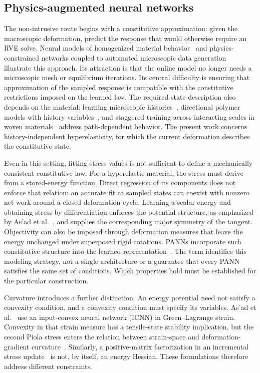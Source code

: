 \subsection{Physics-augmented neural networks}
The non-intrusive route begins with a constitutive approximation: given the macroscopic deformation, predict the response that would otherwise require an RVE solve. Neural models of homogenized material behavior~\cite{Aldakheel2023} and physics-constrained networks coupled to automated microscopic data generation~\cite{kalina2023} illustrate this approach. Its attraction is that the online model no longer needs a microscopic mesh or equilibrium iterations. Its central difficulty is ensuring that approximation of the sampled response is compatible with the constitutive restrictions imposed on the learned law. The required state description also depends on the material: learning microscopic histories~\cite{Liu2022}, directional polymer models with history variables~\cite{Ghaderi2020}, and staggered training across interacting scales in woven materials~\cite{AsadFarhat2026} address path-dependent behavior. The present work concerns history-independent hyperelasticity, for which the current deformation describes the constitutive state.

Even in this setting, fitting stress values is not sufficient to define a mechanically consistent constitutive law. For a hyperelastic material, the stress must derive from a stored-energy function. Direct regression of its components does not enforce that relation: an accurate fit at sampled states can coexist with nonzero net work around a closed deformation cycle. Learning a scalar energy and obtaining stress by differentiation enforces the potential structure, as emphasized by As'ad et al.~\cite{asad2022}, and supplies the corresponding major symmetry of the tangent. Objectivity can also be imposed through deformation measures that leave the energy unchanged under superposed rigid rotations. PANNs incorporate such constitutive structure into the learned representation~\cite{klein2022,linden2023}. The term identifies this modeling strategy, not a single architecture or a guarantee that every PANN satisfies the same set of conditions. Which properties hold must be established for the particular construction.

Curvature introduces a further distinction. An energy potential need not satisfy a convexity condition, and a convexity condition must specify its variables. As'ad et al.~\cite{asad2022} use an input-convex neural network (ICNN) in Green--Lagrange strain. Convexity in that strain measure has a tensile-state stability implication, but the second Piola stress enters the relation between strain-space and deformation-gradient curvature~\cite{GaoNeffRoventaThiel2017}. Similarly, a positive-matrix factorization in an incremental stress update~\cite{Xu2021} is not, by itself, an energy Hessian. These formulations therefore address different constraints.

